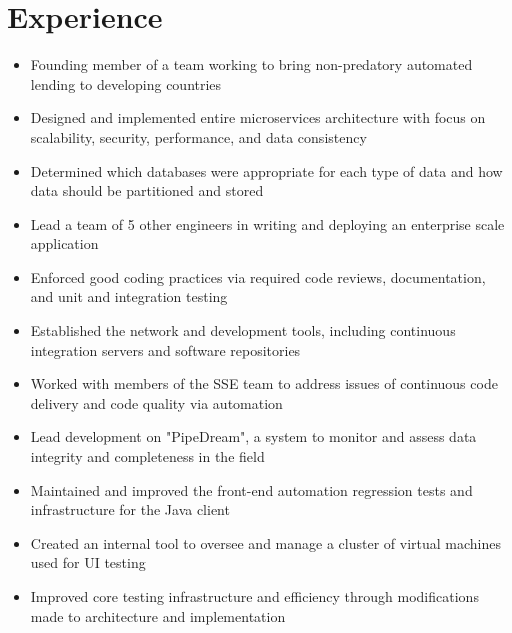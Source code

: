 \documentclass[11pt,letterpaper,sans]{moderncv}        %
\begin{document}
\makecvtitle

\vspace{-10mm}

\section{Experience}
\begin{itemize}
\item Founding member of a team working to bring non-predatory automated lending to developing countries
\item Designed and implemented entire microservices architecture with focus on scalability, security, performance, and data consistency
\item Determined which databases were appropriate for each type of data and how data should be partitioned and stored
\item Lead a team of 5 other engineers in writing and deploying an enterprise scale application
\item Enforced good coding practices via required code reviews, documentation, and unit and integration testing
\item Established the network and development tools, including continuous integration servers and software repositories
\end{itemize}

\begin{itemize}
\item Worked with members of the SSE team to address issues of continuous code delivery and code quality via automation
\item Lead development on "PipeDream", a system to monitor and assess data integrity and completeness in the field
\item Maintained and improved the front-end automation regression tests and infrastructure for the Java client
\end{itemize}

\begin{itemize}
\item Created an internal tool to oversee and manage a cluster of virtual machines used for UI testing
\item Improved core testing infrastructure and efficiency through modifications made to architecture and implementation
\end{itemize}
\end{document}
